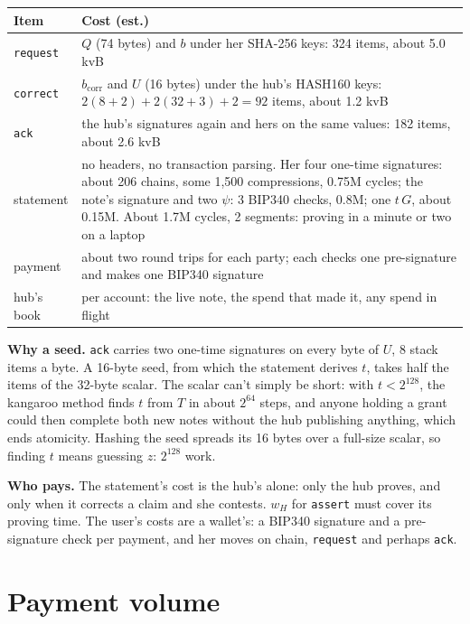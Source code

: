 \documentclass[11pt]{article}
\theoremstyle{plain}
\theoremstyle{definition}
\newcommand{\bcorr}{b_{\mathrm{corr}}}
\newcommand{\tx}[1]{\texttt{#1}}
\begin{document}
\begin{center}
\begin{tabularx}{\linewidth}{lL}
\toprule
Item & Cost (est.) \\
\midrule
\tx{request} & $Q$ (74 bytes) and $b$ under her SHA-256 keys: 324 items, about 5.0 kvB \\
\tx{correct} & $\bcorr$ and $U$ (16 bytes) under the hub's HASH160 keys: $2(8 + 2) + 2(32 + 3) + 2 = 92$ items, about 1.2 kvB \\
\tx{ack} & the hub's signatures again and hers on the same values: 182 items, about 2.6 kvB \\
statement & no headers, no transaction parsing. Her four one-time signatures: about 206 chains, some 1,500 compressions, 0.75M cycles; the note's signature and two $\psi$: 3 BIP340 checks, 0.8M; one $t\,G$, about 0.15M. About 1.7M cycles, 2 segments: proving in a minute or two on a laptop \\
payment & about two round trips for each party; each checks one pre-signature and makes one BIP340 signature \\
hub's book & per account: the live note, the spend that made it, any spend in flight \\
\bottomrule
\end{tabularx}
\end{center}

\textbf{Why a seed.} \tx{ack} carries two one-time signatures on every
byte of $U$, 8 stack items a byte. A 16-byte seed, from which the
statement derives $t$, takes half the items of the 32-byte scalar. The
scalar can't simply be short: with $t < 2^{128}$, the kangaroo method
finds $t$ from $T$ in about $2^{64}$ steps, and anyone holding a grant
could then complete both new notes without the hub publishing anything,
which ends atomicity. Hashing the seed spreads its 16 bytes over a
full-size scalar, so finding $t$ means guessing $z$: $2^{128}$ work.

\textbf{Who pays.} The statement's cost is the hub's alone: only the
hub proves, and only when it corrects a claim and she contests. $w_H$
for \tx{assert} must cover its proving time. The user's costs are a
wallet's: a BIP340 signature and a pre-signature check per payment, and
her moves on chain, \tx{request} and perhaps \tx{ack}.

\section{Payment volume}\label{sec:volume-pay}
\end{document}

